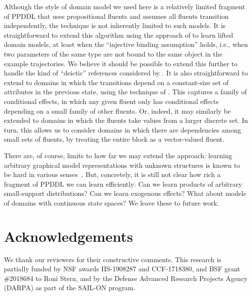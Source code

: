 \documentclass[letterpaper]{article} %
\begin{document}
Although the style of domain model we used here is a relatively limited fragment of PPDDL that uses propositional fluents and assumes all fluents transition independently, the technique is not inherently limited to such models. It is straightforward to extend this algorithm using the approach of \citet{juba2021kr} to learn lifted domain models, at least when the ``injective binding assumption'' holds, i.e., when two parameters of the same type are not bound to the same object in the example trajectories. We believe it should be possible to extend this further to handle the kind of ``deictic'' references considered by \citet{pasula2007learning}. It is also straightforward to extend to domains in which the transitions depend on a constant-size set of attributes in the previous state, using the technique of \citet{strehl2007efficient}. This captures a family of conditional effects, in which any given fluent only has conditional effects depending on a small family of other fluents. Or, indeed, it may similarly be extended to domains in which the fluents take values from a larger discrete set. In turn, this allows us to consider domains in which there are dependencies among small sets of fluents, by treating the entire block as a vector-valued fluent. 

There are, of course, limits to how far we may extend the approach: learning arbitrary graphical model representations with unknown structures is known to be hard in various senses~\cite{chickering1996learning,chickering2004large}. But, concretely, it is still not clear how rich a fragment of PPDDL we can learn efficiently: Can we learn products of arbitrary small-support distributions? Can we learn exogenous effects?  What about models of domains with continuous state spaces? We leave these to future work.

\section*{Acknowledgements}
We thank our reviewers for their constructive comments.
This research is partially funded by NSF awards IIS-1908287 and CCF-1718380,
and BSF grant \#2018684 to Roni Stern, 
and by the Defense Advanced
Research Projects Agency (DARPA) as part of the SAIL-ON program. %




\iffalse{
\section{Not in paper}

- Hardness of learning PPDDL action models from data
- Learning a standard PPDDL model. Need to add the number of effects per action to the complexity analysis. [[Roni: I think the issue here was that in Theorem 5 the sample complexity does not include the number of effects per action. This might be missing? not sure about this]]
I don't think it's missing. We conservatively take $2|F|$ as an upper bound on the number of effects per action. This is why we have $\delta'=\delta/2|F||A|$ under the log.
}\fi
\end{document}
